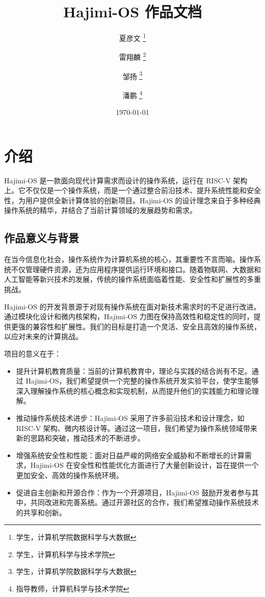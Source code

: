 \documentclass[UTF8]{article}
\begin{document}
\title{\Huge Hajimi-OS 作品文档}
\author{夏彦文 \thanks{学生，计算机学院数据科学与大数据} \and 雷翔麟 \thanks{学生，计算机科学与技术学院}
  \and 邹扬 \thanks{学生，计算机学院数据科学与大数据} \and 潘鹏 \thanks{指导教师，计算机科学与技术学院}}
\date{\today}
\maketitle

\newpage
\tableofcontents
\newpage


\section{介绍}
Hajimi-OS 是一款面向现代计算需求而设计的操作系统，运行在 RISC-V 架构上。它不仅仅是一个操作系统，而是一个通过整合前沿技术、提升系统性能和安全性，为用户提供全新计算体验的创新项目。Hajimi-OS 的设计理念来自于多种经典操作系统的精华，并结合了当前计算领域的发展趋势和需求。

\subsection{作品意义与背景}
在当今信息化社会，操作系统作为计算机系统的核心，其重要性不言而喻。操作系统不仅管理硬件资源，还为应用程序提供运行环境和接口。随着物联网、大数据和人工智能等新兴技术的发展，传统的操作系统面临着性能、安全性和扩展性的多重挑战。

Hajimi-OS 的开发背景源于对现有操作系统在面对新技术需求时的不足进行改进。通过模块化设计和微内核架构，Hajimi-OS 力图在保持高效性和稳定性的同时，提供更强的兼容性和扩展性。我们的目标是打造一个灵活、安全且高效的操作系统，以应对未来的计算挑战。

项目的意义在于：
\begin{itemize}
  \item 提升计算机教育质量：当前的计算机教育中，理论与实践的结合尚有不足。通过 Hajimi-OS，我们希望提供一个完整的操作系统开发实验平台，使学生能够深入理解操作系统的核心概念和实现机制，从而提升他们的实践能力和理论理解。
  \item 推动操作系统技术进步：Hajimi-OS 采用了许多前沿技术和设计理念，如 RISC-V 架构、微内核设计等。通过这一项目，我们希望为操作系统领域带来新的思路和突破，推动技术的不断进步。
  \item 增强系统安全性和性能：面对日益严峻的网络安全威胁和不断增长的计算需求，Hajimi-OS 在安全性和性能优化方面进行了大量创新设计，旨在提供一个更加安全、高效的操作系统环境。
  \item 促进自主创新和开源合作：作为一个开源项目，Hajimi-OS 鼓励开发者参与其中，共同改进和完善系统。通过开源社区的合作，我们希望推动操作系统技术的共享和创新。
\end{itemize}
\end{document}

